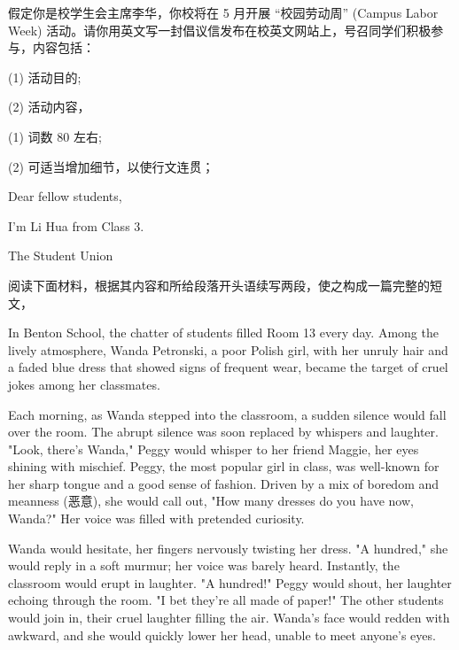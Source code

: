 \documentclass{英语试卷}
\begin{document}
\par 假定你是校学生会主席李华，你校将在 5 月开展 “校园劳动周” (Campus Labor Week) 活动。请你用英文写一封倡议信发布在校英文网站上，号召同学们积极参与，内容包括：\par
\par (1) 活动目的;\par
\par (2) 活动内容，\par
\par (1) 词数 80 左右;\par
\par (2) 可适当增加细节，以使行文连贯；\par
\par Dear fellow students,\par
\par I'm Li Hua from Class 3.\par
\par The Student Union\par
{}
\par 阅读下面材料，根据其内容和所给段落开头语续写两段，使之构成一篇完整的短文，\par
\par In Benton School, the chatter of students filled Room 13 every day. Among the lively atmosphere, Wanda Petronski, a poor Polish girl, with her unruly hair and a faded blue dress that showed signs of frequent wear, became the target of cruel jokes among her classmates.\par
\par Each morning, as Wanda stepped into the classroom, a sudden silence would fall over the room. The abrupt silence was soon replaced by whispers and laughter. "Look, there’s Wanda," Peggy would whisper to her friend Maggie, her eyes shining with mischief. Peggy, the most popular girl in class, was well-known for her sharp tongue and a good sense of fashion. Driven by a mix of boredom and meanness (恶意), she would call out, "How many dresses do you have now, Wanda?" Her voice was filled with pretended curiosity.\par
\par Wanda would hesitate, her fingers nervously twisting her dress. "A hundred," she would reply in a soft murmur; her voice was barely heard. Instantly, the classroom would erupt in laughter. "A hundred!" Peggy would shout, her laughter echoing through the room. "I bet they're all made of paper!" The other students would join in, their cruel laughter filling the air. Wanda's face would redden with awkward, and she would quickly lower her head, unable to meet anyone's eyes.\par
\end{document}
